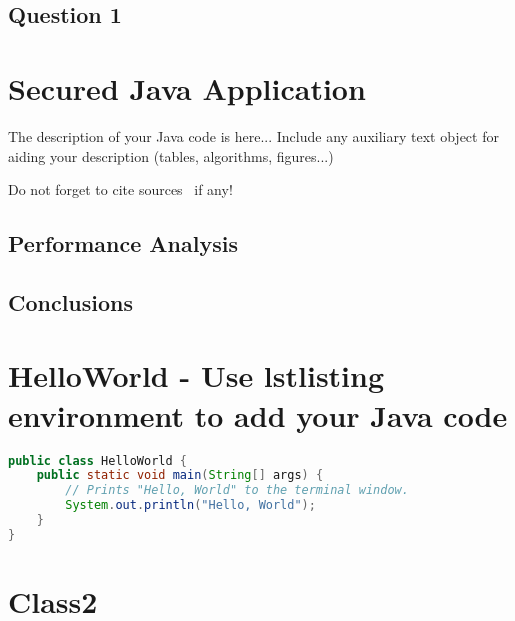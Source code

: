 \documentclass[format=acmsmall, review=false, screen=true]{acmart}
\begin{document}
\subsection{Question 1}

\lipsum[2-4]



\section{Secured Java Application}

The description of your Java code is here... Include any auxiliary text object for aiding your description (tables, algorithms, figures...)

Do not forget to cite sources~\cite{GnutellaNet2002} if any!


\subsection{Performance Analysis}

\lipsum[2-4]


\subsection{Conclusions}






\appendix

\section{HelloWorld - Use lstlisting environment to add your Java code}
\begin{spacing}{0.8}
\begin{lstlisting}[language=Java]
public class HelloWorld {
    public static void main(String[] args) {
        // Prints "Hello, World" to the terminal window.
        System.out.println("Hello, World");
    }
}
\end{lstlisting}
\end{spacing} 

\clearpage

\section{Class2}
\end{document}
